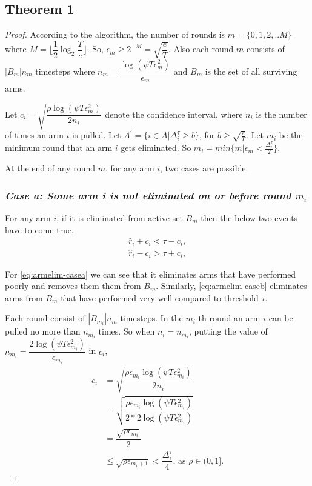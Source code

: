 \subsection{Theorem 1}

\begin{proof}

According to the algorithm, the number of rounds is $m=\lbrace 0,1,2,.. M\rbrace $ where $M=\big\lfloor \dfrac{1}{2}\log_{2} \dfrac{T}{e}\big\rfloor$. So, $\epsilon_{m}\geq 2^{-M} = \sqrt{\dfrac{e}{T}}$. Also each round $m$ consists of $|B_{m}|n_{m}$ timesteps where $n_{m} = \dfrac{\log(\psi T \epsilon_{m}^{2})}{\epsilon_{m}}$ and $B_{m}$ is the set of all surviving arms. 

Let $c_{i} = \sqrt{\dfrac{\rho\log{(\psi T\epsilon_{m}^{2})}}{2 n_{i}}}$ denote the confidence interval, where $n_{i}$ is the number of times an arm $i$ is pulled. Let $A^{'}=\lbrace i\in A|\Delta_{i}^{\tau}\geq b\rbrace$, for $b\geq \sqrt{\frac{e}{T}}$. Let $m_{i}$ be the minimum round that an arm $i$ gets eliminated. So $m_{i}=min\lbrace m| \epsilon_{m}<\frac{\Delta_{i}^{\tau}}{2}\rbrace$. 

At the end of any round $m$, for any arm $i$, two cases are possible.

\subsubsection{\textit{Case a: Some arm i is not eliminated on or before round $m_{i}$}}
For any arm $i$, if it is eliminated from active set $B_{m}$ then the below two events have to come true,
\begin{align}
\hat{r}_{i} + c_{i} < \tau - c_{i}, \label{eq:armelim-casea}\\
\hat{r}_{i} - c_{i} > \tau + c_{i}, \label{eq:armelim-caseb}
\end{align}

For \ref{eq:armelim-casea} we can see that it eliminates arms that have performed poorly and removes them them from $B_{m}$. Similarly, \ref{eq:armelim-caseb} eliminates arms from $B_{m}$ that have performed very well compared to threshold $\tau$.

Each round consist of $|B_{m_{i}}|n_{m}$ timesteps. In the $m_{i}$-th round an arm $i$ can be pulled no more than $n_{m_{i}}$ times. So when $n_{i}=n_{m_{i}}$, putting the value of $n_{m_{i}}=\dfrac{2\log{(\psi T\epsilon_{m_{i}}^{2})}}{\epsilon_{m_{i}}}$ in $c_{i}$, 
\begin{align*}
c_{i}&=\sqrt{\dfrac{\rho\epsilon_{m_{i}}\log (\psi T\epsilon_{m_{i}}^{2})}{2 n_{i}}}\\
&=\sqrt{\dfrac{\rho\epsilon_{m_{i}}\log (\psi T\epsilon_{m_{i}}^{2})}{2*2 \log(\psi T\epsilon_{m_{i}}^{2})}}\\
& =\dfrac{\sqrt{\rho\epsilon_{m_{i}}}}{2}\\
& \leq \sqrt{\rho\epsilon_{m_{i}+1}} < \dfrac{\Delta_{i}^{\tau}}{4} \text{, as }\rho\in (0,1].
\end{align*}


\end{proof}
